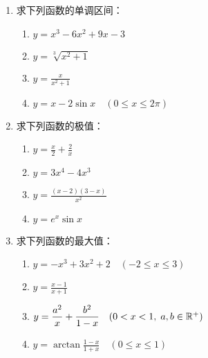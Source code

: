 \begin{enumerate}
    \item 求下列函数的单调区间：
\begin{multicols}{2}
\begin{enumerate}[(1)]
 \item $y=x^3-6x^2+9x-3$
\item $y= \sqrt [ 3] {x^2+ 1}$ 
\item $y=\frac{x}{x^{2}+1}$
\item $y=x-2\sin x\quad (0\leqslant x\leqslant 2\pi)$   
\end{enumerate}
\end{multicols}

\item    求下列函数的极值：
\begin{multicols}{2}
\begin{enumerate}[(1)]
\item $y=\frac{x}{2}+\frac{2}{x}$ 
\item $y=3x^4-4x^3$ 
\item $y=\frac{(x-2)(3-x)}{x^{2}}$
\item $y=e^x\sin x$    
\end{enumerate}
\end{multicols}

\item 求下列函数的最大值：
\begin{enumerate}[(1)]
    \item     $y= - x^{3}+ 3x^{2}+ 2\quad ( - 2\leqslant x\leqslant 3)$ 
    \item       $y=\frac{x-1}{x+1}$
    \item     $y= \dfrac {a^{2}}x+ \dfrac {b^{2}}{1- x}\quad ( 0< x< 1,\;  a, b\in \mathbb{R}^{+ })$ 
    \item       $y= \arctan \frac {1- x}{1+ x}\quad ( 0\leqslant x\leqslant 1)$
\end{enumerate}


\end{enumerate}
